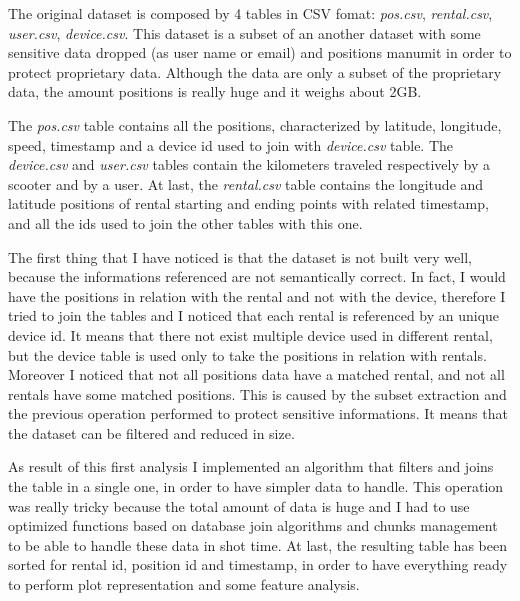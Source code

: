 The original dataset is composed by 4 tables in CSV fomat: \textit{pos.csv}, \textit{rental.csv}, \textit{user.csv}, \textit{device.csv}. This dataset is a subset of an another dataset with some sensitive data dropped (as user name or email) and positions manumit in order to protect proprietary data. Although the data are only a subset of the proprietary data, the amount positions is really huge and it weighs about 2GB. 

The \textit{pos.csv} table contains all the positions, characterized by latitude, longitude, speed, timestamp and a device id used to join with \textit{device.csv} table. The \textit{device.csv} and \textit{user.csv} tables contain the kilometers traveled respectively by a scooter and by a user. At last, the \textit{rental.csv} table contains the longitude and latitude positions of rental starting and ending points with related timestamp, and all the ids used to join the other tables with this one. 

The first thing that I have noticed is that the dataset is not built very well, because the informations referenced are not semantically correct. In fact, I would have the positions in relation with the rental and not with the device, therefore I tried to join the tables and I noticed that each rental is referenced by an unique device id. It means that there not exist multiple device used in different rental, but the device table is used only to take the positions in relation with rentals. Moreover I noticed that not all positions data have a matched rental, and not all rentals have some matched positions. This is caused by the subset extraction and the previous operation performed to protect sensitive informations. It means that the dataset can be filtered and reduced in size.

As result of this first analysis I implemented an algorithm that filters and joins the table in a single one, in order to have simpler data to handle. This operation was really tricky because the total amount of data is huge and I had to use optimized functions based on database join algorithms and chunks management to be able to handle these data in shot time. At last, the resulting table has been sorted for rental id, position id and timestamp, in order to have everything ready to perform plot representation and some feature analysis.

